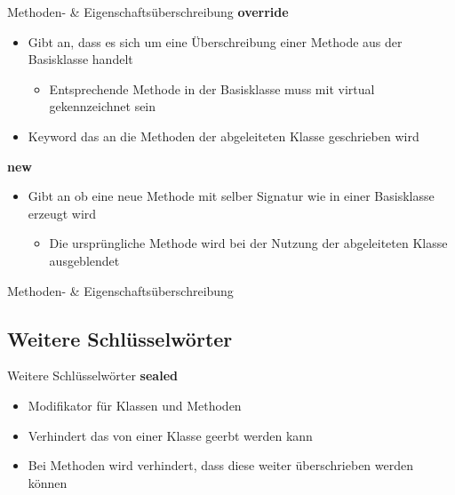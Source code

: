 \begin{frame}{Methoden- \& Eigenschaftsüberschreibung}	
	\textbf{override}\\
	\begin{itemize}
		\item Gibt an, dass es sich um eine Überschreibung einer Methode aus der Basisklasse handelt
		\begin{itemize}
			\item Entsprechende Methode in der Basisklasse muss mit \alert{virtual} gekennzeichnet sein
		\end{itemize}
		\item Keyword das an die Methoden der abgeleiteten Klasse geschrieben wird
	\end{itemize}
	\textbf{new}\\
	\begin{itemize}
		\item Gibt an ob eine neue Methode mit selber Signatur wie in einer Basisklasse erzeugt wird
		\begin{itemize}
			\item Die ursprüngliche Methode wird bei der Nutzung der abgeleiteten Klasse ausgeblendet
		\end{itemize}
	\end{itemize}
\end{frame}

\begin{frame}{Methoden- \& Eigenschaftsüberschreibung}
	
\end{frame}

\subsection{Weitere Schlüsselwörter}
\begin{frame}{Weitere Schlüsselwörter}
	\textbf{sealed}\\
	\begin{itemize}
		\item Modifikator für Klassen und Methoden
		\item Verhindert das von einer Klasse geerbt werden kann
		\item Bei Methoden wird verhindert, dass diese weiter überschrieben werden können
	\end{itemize}
	
\end{frame}

